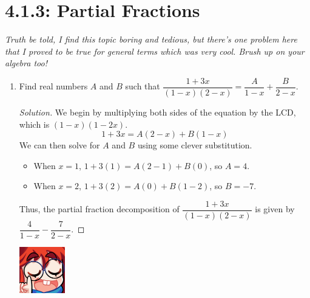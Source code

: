 \documentclass{article}
\newenvironment{solution}
  {\renewcommand\qedsymbol{$\blacksquare$}\begin{proof}[Solution]}
  {\end{proof}}
\begin{document}
\section*{4.1.3: Partial Fractions}
\textit{Truth be told, I find this topic boring and tedious, but there's one problem here that I proved to be true for general terms which was very cool. Brush up on your algebra too!} 
\begin{enumerate} 
    \item Find real numbers $A$ and $B$ such that $\dfrac{1+3x}{(1-x)(2-x)} = \dfrac{A}{1-x} + \dfrac{B}{2-x}$.\begin{solution} 
        We begin by multiplying both sides of the equation by the LCD, which is $(1-x)(1-2x)$.\[
            1+3x = A(2-x) + B(1-x)  
        \] We can then solve for $A$ and $B$ using some clever substitution.\begin{itemize} 
            \item When $x=1$, $1+3(1) = A(2-1) + B(0)$, so $A=4$. 
            \item When $x=2$, $1+3(2) = A(0) + B(1-2)$, so $B=-7$. 
        \end{itemize} Thus, the partial fraction decomposition of $\dfrac{1+3x}{(1-x)(2-x)}$ is given by $\dfrac{4}{1-x} - \dfrac{7}{2-x}$.
    \end{solution} 
    \begin{minipage}[t]{.14\textwidth}
        \vspace{0pt}
        \includegraphics[width=2cm]{nerd_maddy.png} 
    \end{minipage}%
\end{enumerate}
\end{document}
